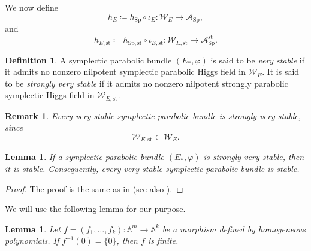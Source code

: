 \documentclass[11pt, reqno]{amsart}
\numberwithin{equation}{section}
\newcommand{\Sp}{\mathrm{Sp}}
\newtheorem{lemma}[theorem]{Lemma}
\newtheorem{remark}[theorem]{Remark}
\theoremstyle{definition}
\newtheorem{definition}[theorem]{Definition}
\begin{document}
We now define
\begin{equation}\label{eq:hE}
h_E \coloneqq h_{\Sp}\circ \iota_E : \mathcal{W}_E \longrightarrow \mathcal{A}_{\Sp},
\end{equation}
and
\begin{equation}\label{eq:hEst}
h_{E,\mathrm{st}} \coloneqq h_{\Sp,\mathrm{st}}\circ \iota_{E,\mathrm{st}} : \mathcal{W}_{E,\mathrm{st}} \longrightarrow \mathcal{A}^{\mathrm{st}}_{\Sp}.
\end{equation}

\begin{definition}
A symplectic parabolic bundle $(E_*,\varphi)$ is said to be \textit{very stable} if it admits no nonzero nilpotent symplectic parabolic Higgs field in $\mathcal{W}_E$. It is said to be \textit{strongly very stable} if it admits no nonzero nilpotent strongly parabolic symplectic Higgs field in $\mathcal{W}_{E,\mathrm{st}}$.
\end{definition}

\begin{remark}
Every very stable symplectic parabolic bundle is strongly very stable, since
\[
\mathcal{W}_{E,\mathrm{st}} \subset \mathcal{W}_E.
\]
\end{remark}

\begin{lemma}\label{lemma:svs-stable}
If a symplectic parabolic bundle $(E_*,\varphi)$ is strongly very stable, then it is stable. Consequently, every very stable symplectic parabolic bundle is stable.
\end{lemma}
\begin{proof}
The proof is the same as in \cite[Lemma $3.5$]{P24} (see also \cite[Proposition $3.5$]{L88}).
\end{proof}

We will use the following lemma for our purpose.
\begin{lemma}{\cite[Lemma $1.3$]{Z20}}\label{finite}
Let $f=(f_1,\dots,f_k):\mathbb{A}^m \longrightarrow \mathbb{A}^k$ be a morphism defined by homogeneous polynomials. If $f^{-1}(0)=\{0\}$, then $f$ is finite.
\end{lemma}
\end{document}
